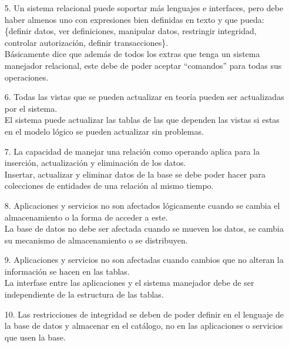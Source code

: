 \documentclass[12pt,a4paper]{article}
\begin{document}
\begin{enumerate}
\begin{enumerate}
\begin{enumerate}
					\item[5.] Un sistema relacional puede soportar más lenguajes e interfaces, pero
						debe haber almenos uno con expresiones bien definidas en texto y que pueda:
						\{definir datos, ver definiciones, manipular datos, restringir integridad,
						controlar autorización, definir transacciones\}.\\

						Básicamente dice que además de todos los extras que tenga un sistema
						manejador relacional, este debe de poder aceptar ``comandos''
						para todas sus operaciones.\\

					\item[6.] Todas las vistas que se pueden actualizar en teoría pueden
						ser actualizadas por el sistema.\\

						El sistema puede actualizar las tablas de las que dependen
						las vistas si estas en el modelo lógico se pueden actualizar
						sin problemas.\\

					\item[7.] La capacidad de manejar una relación como operando aplica para
						la inserción, actualización y eliminación de los datos.\\

						Insertar, actualizar y eliminar datos de la base se debe poder
						hacer para colecciones de entidades de una relación al mismo tiempo.\\

					\item[8.] Aplicaciones y servicios no son afectados lógicamente cuando
						se cambia el almacenamiento o la forma de acceder a este.\\

						La base de datos no debe ser afectada cuando se mueven los datos,
						se cambia su mecanismo de almacenamiento o se distribuyen.\\

					\item[9.] Aplicaciones y servicios no son afectadas cuando cambios
						que no alteran la información se hacen en las tablas.\\

						La interfase entre las aplicaciones y el sistema manejador
						debe de ser independiente de la estructura de las tablas.\\

					\item[10.] Las restricciones de integridad se deben de poder definir en
						el lenguaje de la base de datos y almacenar en el catálogo, no
						en las aplicaciones o servicios que usen la base.\\


\end{enumerate}
\end{enumerate}
\end{enumerate}
\end{document}
